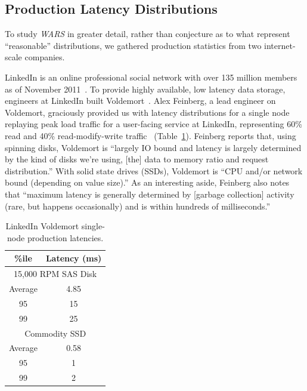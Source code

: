\documentclass{vldb}
\newcommand{\subsectionskip}{-0em}
\begin{document}
\vspace{\subsectionskip}\subsection{Production Latency Distributions}
\label{sec:latencies}

To study \textit{WARS} in greater detail, rather than conjecture as to
what represent ``reasonable'' distributions, we gathered production
statistics from two internet-scale companies.

LinkedIn is an online professional social network with over 135
million members as of November 2011~\cite{linkedin}. To provide highly
available, low latency data storage, engineers at LinkedIn built
Voldemort~\cite{voldemort, voldemortpub}.  Alex Feinberg, a lead
engineer on Voldemort, graciously provided us with latency
distributions for a single node replaying peak load traffic for a
user-facing service at LinkedIn, representing 60\% read and 40\%
read-modify-write traffic~\cite{feinbergpc}
(Table~\ref{table:linkedin}).  Feinberg reports that, using spinning
disks, Voldemort is ``largely IO bound and latency is largely
determined by the kind of disks we're using, [the] data to memory
ratio and request distribution.''  With solid state drives (SSDs),
Voldemort is ``CPU and/or network bound (depending on value size).''
As an interesting aside, Feinberg also notes that ``maximum latency is
generally determined by [garbage collection] activity (rare, but
happens occasionally) and is within hundreds of milliseconds.''

\begin{table}
\centering
\begin{tabular}{|c|c|}
\hline
\%ile & Latency (ms) \\
\hline
\multicolumn{2}{|c|}{ 15,000 RPM SAS Disk}\\
\hline
Average & 4.85\\
95 & 15\\
99 & 25\\
\hline
\multicolumn{2}{|c|}{ Commodity SSD }\\
\hline
Average & 0.58 \\
95 & 1\\
99 & 2\\
\hline
\end{tabular}
\vspace{-6pt}
\caption{LinkedIn Voldemort single-node production latencies.}
\vspace{-12pt}
\label{table:linkedin}
\end{table}
\end{document}
